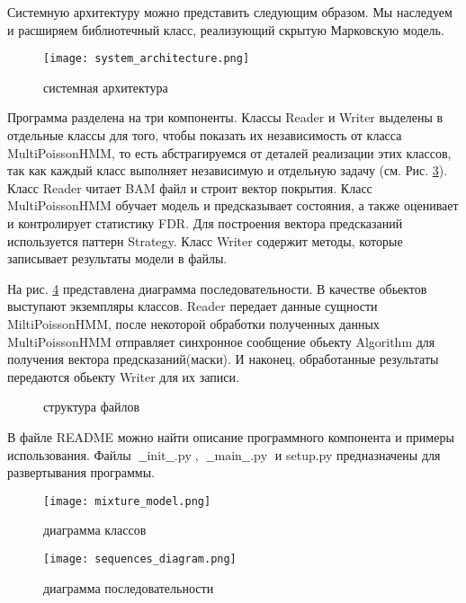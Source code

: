 \documentclass{matmex-diploma-custom}
\begin{document}
Системную архитектуру можно представить следующим образом. Мы наследуем и расширяем библиотечный класс, реализующий скрытую Марковскую модель.

\begin{figure}[h]
\centering
\texttt{[image: system\_architecture.png]}
\caption{системная архитектура}
\label{fig:system_architecture}
\end{figure}

Программа разделена на три компоненты. Классы Reader и Writer выделены в отдельные классы для того, чтобы показать их независимость от класса MultiPoissonHMM, то есть абстрагируемся от деталей реализации этих классов, так как каждый класс выполняет независимую и отдельную задачу (см. Рис. \ref{fig:classes_diagram}). Класс Reader читает BAM файл и строит вектор покрытия. Класс MultiPoissonHMM обучает модель и предсказывает состояния, а также оценивает и контролирует статистику FDR. Для построения вектора предсказаний используется паттерн Strategy. Класс Writer содержит методы, которые записывает результаты модели в файлы. 

На рис. \ref{fig:seqdia} представлена диаграмма последовательности. В качестве обьектов выступают экземпляры классов. Reader передает данные сущности MiltiPoissonHMM, после некоторой обработки полученных данных MultiPoissonHMM отправляет синхронное сообщение обьекту Algorithm для получения вектора предсказаний(маски). И наконец, обработанные результаты передаются обьекту Writer для их записи. 

\begin{figure}
\label{fig:dir}
\caption{структура файлов}
\end{figure}

В файле README можно найти описание программного компонента и примеры использования. Файлы $\operatorname{\_\_init\_\_.py}$, $\operatorname{\_\_main\_\_.py}$ и setup.py предназначены для развертывания программы.

\begin{figure}
\centering
\texttt{[image: mixture\_model.png]}
\caption{диаграмма классов}
\label{fig:classes_diagram}
\end{figure}

\begin{figure}
\label{fig:seqdia}
\centering
\texttt{[image: sequences\_diagram.png]}
\caption{диаграмма последовательности}
\end{figure}
\end{document}
